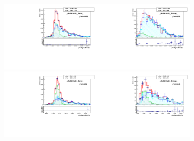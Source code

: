 \begin{figure}[htb]
  \begin{center}
   \includegraphics[width=0.45\textwidth]{../figs/figs_v11/ELECTRON_WGamma/TemplateFits/c_TEMPL_SIHIH_UNblind__phoEt15to20__Barrel__RooFit_MCclosure.pdf}\includegraphics[width=0.45\textwidth]{../figs/figs_v11/ELECTRON_WGamma/TemplateFits/c_TEMPL_SIHIH_UNblind__phoEt15to20__Endcap__RooFit_MCclosure.pdf}\\
   \includegraphics[width=0.45\textwidth]{../figs/figs_v11/ELECTRON_WGamma/TemplateFits/c_TEMPL_SIHIH_UNblind__phoEt20to25__Barrel__RooFit_MCclosure.pdf}\includegraphics[width=0.45\textwidth]{../figs/figs_v11/ELECTRON_WGamma/TemplateFits/c_TEMPL_SIHIH_UNblind__phoEt20to25__Endcap__RooFit_MCclosure.pdf}\\

\end{center}
\end{figure}
